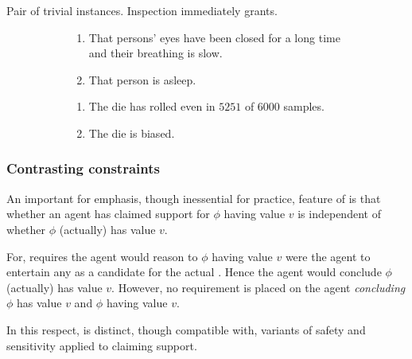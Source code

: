 \begin{note}
  Pair of trivial instances.
  Inspection immediately grants.
  \begin{illustration}
    \begin{figure}[h!]
    \mbox{}\hfill
    \begin{subfigure}{0.45\linewidth}
      \begin{enumerate}
      \item That persons' eyes have been closed for a long time and their breathing is slow.
      \item That person is asleep.
      \end{enumerate}
      \caption{}
    \end{subfigure}
    \hfill
    \begin{subfigure}{0.45\linewidth}
      \begin{enumerate}
      \item The die has rolled even in \(5251\) of \(6000\) samples.
      \item The die is biased.
      \end{enumerate}
      \caption{}
    \end{subfigure}
    \hfill\mbox{}
    \caption{}
    \label{fig:ideaS:basic-examples}
  \end{figure}
\end{illustration}
\end{note}


\subsubsection{Contrasting constraints}
\label{sec:ideaS:contrast}

\begin{note}
  An important for emphasis, though inessential for practice, feature of \ideaS{} is that whether an agent has claimed support for \(\phi\) having value \(v\) is independent of whether \(\phi\) (actually) has value \(v\).

  For, \ideaS{} requires the agent would reason to \(\phi\) having value \(v\) were the agent to entertain any \epPW{} as a candidate for the actual \world{}.
  Hence the agent would conclude \(\phi\) (actually) has value \(v\).
  However, no requirement is placed on the agent \emph{concluding} \(\phi\) has value \(v\) and \(\phi\) having value \(v\).

  In this respect, \ideaS{} is distinct, though compatible with, variants of safety and sensitivity applied to claiming support.
\end{note}

